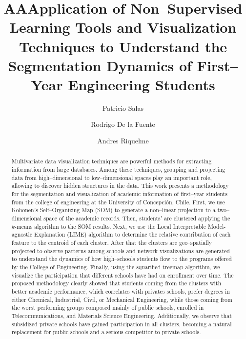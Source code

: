 \documentclass[5p,authoryear,preprint,12pt]{elsarticle}
\begin{document}
\begin{frontmatter}
	
\title{AAApplication of Non--Supervised Learning Tools and Visualization Techniques to Understand the Segmentation Dynamics of First--Year Engineering Students
}
  
\author[a]{Patricio Salas}
\author[a]{Rodrigo De la Fuente}
\author[b]{Andres Riquelme}
\address[a]{Department of Industrial Engineering\unskip, 
	Universidad de Concepci\'{o}n\unskip, Concepci\'{o}n\unskip, Chile}
\address[b]{Facultad de Econom\'{\i}a y Negocios\unskip, 
  Universidad de Talca}
 

\begin{abstract}
 Multivariate data visualization techniques are powerful methods for extracting information from large databases. Among these techniques, grouping and projecting data from high--dimensional to low--dimensional spaces play an important role, allowing to discover hidden structures in the data. This work presents a methodology for the segmentation and visualization of academic information of first--year students from the college of engineering at the University of Concepci\'on, Chile. First, we use Kohonen's Self--Organizing Map (SOM) to generate a non--linear projection to a two--dimensional space of the academic records. Then, students' are clustered applying the $k$-means algorithm to the SOM results. Next, we use the Local Interpretable Model-agnostic Explanation (LIME) algorithm to determine the relative contribution of each feature to the centroid of each cluster. After that the clusters are geo--spatially projected to observe patterns among schools and network visualizations are generated to understand the dynamics of how high--schools students flow to the programs offered by the College of Engineering. Finally, using the squarified treemap algorithm, we visualize the participation that different schools have had on enrollment over time. The proposed methodology clearly showed that students coming from the clusters with better academic performance, which correlates with privates schools, prefer degrees in either Chemical, Industrial, Civil, or Mechanical Engineering, while those coming from the worst performing groups composed mainly of public schools, enrolled in Telecommunications, and Materials Science Engineering. Additionally, we observe that subsidized private schools have gained participation in all clusters, becoming a natural replacement for public schools and a serious competitor to private schools.
\end{abstract}
\end{frontmatter}
  
\end{document}
